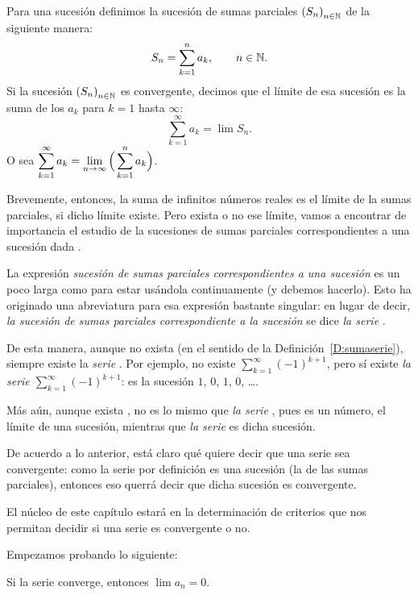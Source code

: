 \begin{definition}\label{D:sumaserie}
Para una sucesión \sucan definimos la sucesión de sumas parciales $\left(S_n\right)_{n\in\mathbb{N}}$ de la siguiente manera:
\[
S_n = \sum_{k=1}^n a_k, \qquad {\ensuremath{n\in\mathbb{N}}}.
\]
Si la sucesión $\left(S_n\right)_{n\in\mathbb{N}}$ es convergente, decimos que el límite de esa sucesión es la suma de los $a_k$ para $k=1$ hasta $\infty$: 
\[
\sum_{k=1}^\infty a_k = \lim S_n.
\]
O sea $\displaystyle \sum_{k=1}^\infty a_k = \lim_{n\to\infty} \Big(\sum_{k=1}^n a_k\Big)$.
\end{definition}

Brevemente, entonces, la suma de infinitos números reales es el límite de la sumas parciales, si dicho límite existe. Pero exista o no ese límite, vamos a encontrar de importancia el estudio de la sucesiones de sumas parciales correspondientes a una sucesión dada \sucan.

La expresión \emph{sucesión de sumas parciales correspondientes a una sucesión} \sucan es un poco larga como para estar usándola continuamente (y debemos hacerlo). Esto ha originado una abreviatura para esa expresión bastante singular: en lugar de decir, \emph{la sucesión de sumas parciales correspondiente a la sucesión \sucan} se dice \emph{la serie \seriean}.

De esta manera, aunque no exista \serieak (en el sentido de la Definición~\ref{D:sumaserie}), siempre existe la \emph{serie \serieak}. Por ejemplo, no existe $\sum_{k=1}^\infty (-1)^{k+1}$, pero sí existe \emph{la serie $\sum_{k=1}^\infty (-1)^{k+1}$}: es la sucesión $1$, $0$, $1$, $0$, \dots.

Más aún, aunque exista \seriean, no es lo mismo que \emph{la serie \seriean}, pues \seriean es un número, el límite de una sucesión, mientras que \emph{la serie \seriean} es dicha sucesión.

De acuerdo a lo anterior, está claro qué quiere decir que una serie sea convergente: como la serie por definición es una sucesión (la de las sumas parciales), entonces eso querrá decir que dicha sucesión es convergente.

El núcleo de este capítulo estará en la determinación de criterios que nos permitan decidir si una serie es convergente o no.

Empezamos probando lo siguiente:

\begin{proposition}\label{P:serie convergente termino tiende a cero}
    Si la serie \seriean converge, entonces $\lim a_n = 0$.
\end{proposition}

